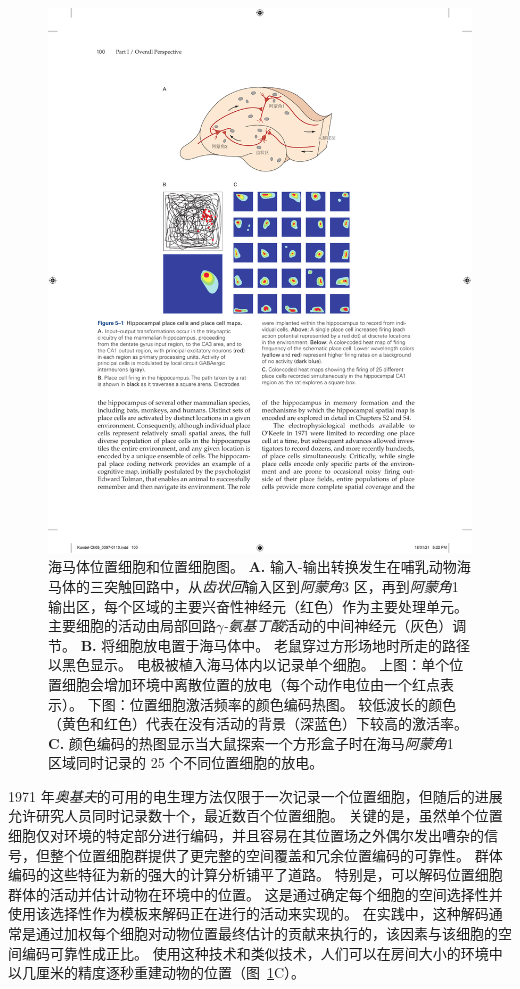 \begin{figure}[htbp]
	\centering
	\includegraphics[width=0.9\linewidth]{chap05/fig_5_1}
	\caption{海马体位置细胞和位置细胞图。 
		\textbf{A.} 输入-输出转换发生在哺乳动物海马体的三突触回路中，从\textit{齿状回}输入区到\textit{阿蒙角}3 区，再到\textit{阿蒙角}1 输出区，每个区域的主要兴奋性神经元（红色）作为主要处理单元。
		主要细胞的活动由局部回路\textit{$\gamma$-氨基丁酸}活动的中间神经元（灰色）调节。
		\textbf{B.} 将细胞放电置于海马体中。
		老鼠穿过方形场地时所走的路径以黑色显示。
		电极被植入海马体内以记录单个细胞。
		上图：单个位置细胞会增加环境中离散位置的放电（每个动作电位由一个红点表示）。
		下图：位置细胞激活频率的颜色编码热图。
		较低波长的颜色（黄色和红色）代表在没有活动的背景（深蓝色）下较高的激活率。 
		\textbf{C.} 颜色编码的热图显示当大鼠探索一个方形盒子时在海马\textit{阿蒙角}1 区域同时记录的 25 个不同位置细胞的放电。}
	\label{fig:5_1}
\end{figure}


1971 年\textit{奥基夫}的可用的电生理方法仅限于一次记录一个位置细胞，但随后的进展允许研究人员同时记录数十个，最近数百个位置细胞。
关键的是，虽然单个位置细胞仅对环境的特定部分进行编码，并且容易在其位置场之外偶尔发出嘈杂的信号，但整个位置细胞群提供了更完整的空间覆盖和冗余位置编码的可靠性。
群体编码的这些特征为新的强大的计算分析铺平了道路。
特别是，可以解码位置细胞群体的活动并估计动物在环境中的位置。
这是通过确定每个细胞的空间选择性并使用该选择性作为模板来解码正在进行的活动来实现的。
在实践中，这种解码通常是通过加权每个细胞对动物位置最终估计的贡献来执行的，该因素与该细胞的空间编码可靠性成正比。
使用这种技术和类似技术，人们可以在房间大小的环境中以几厘米的精度逐秒重建动物的位置（图~\ref{fig:5_1}C）。



